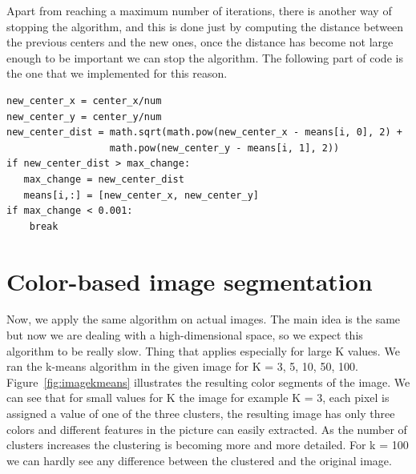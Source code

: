\documentclass[a4paper,10pt]{article}
\begin{document}
Apart from reaching a maximum number of iterations, there is another way of stopping the algorithm, and this is done just by computing the distance between the previous centers and the new ones, once the distance has become not large enough to be important we can stop the algorithm. The following part of code is the one that we implemented for this reason.
\begin{verbatim}
new_center_x = center_x/num
new_center_y = center_y/num
new_center_dist = math.sqrt(math.pow(new_center_x - means[i, 0], 2) + 
                  math.pow(new_center_y - means[i, 1], 2))
if new_center_dist > max_change:
   max_change = new_center_dist
   means[i,:] = [new_center_x, new_center_y]
if max_change < 0.001:
    break
\end{verbatim}

\section{Color-based image segmentation}
Now, we apply the same algorithm on actual images. The main idea is the same but now we are dealing with a high-dimensional space, so we expect this algorithm to be really slow. Thing that applies especially for large K values. We ran the k-means algorithm in the given image for K = 3, 5, 10, 50, 100. Figure~\ref{fig:imagekmeans} illustrates the resulting color segments of the image. We can see that for small values for K the image for example K = 3, each pixel is assigned a value of one of the three clusters, the resulting image has only three colors and different features in the picture can easily extracted. As the number of clusters increases the clustering is becoming more and more detailed. For k = 100 we can hardly see any difference between the clustered and the original image.
\end{document}
